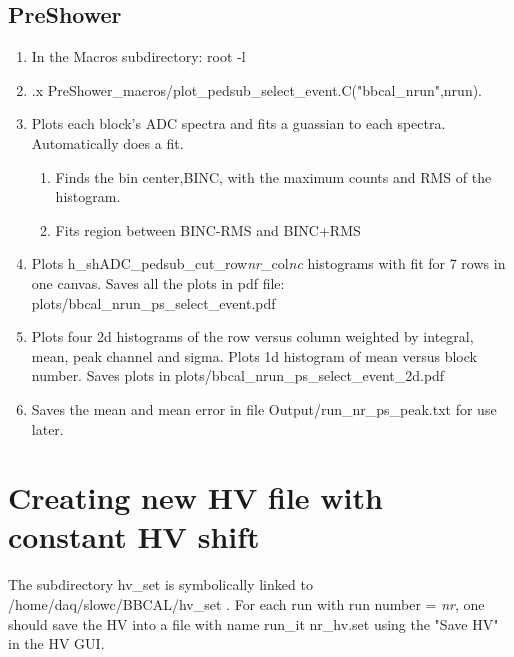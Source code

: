 \documentclass[]{article}
\begin{document}
\subsection{PreShower}
\begin{enumerate}
	\item In the Macros subdirectory: root -l
	\item .x PreShower\_macros/plot\_pedsub\_select\_event.C("bbcal\_nrun",nrun). 
	\item Plots each block's ADC spectra and fits a guassian to each spectra. Automatically does a fit.
	\begin{enumerate}
		\item Finds the bin center,BINC,  with the maximum counts and RMS of the histogram. 
		\item Fits region between BINC-RMS and BINC+RMS
	\end{enumerate}       
	\item Plots  h\_shADC\_pedsub\_cut\_row{\it nr}\_col{\it nc} histograms with fit for 7 rows in one canvas. Saves all the plots in pdf file: plots/bbcal\_nrun\_ps\_select\_event.pdf
	\item Plots four 2d histograms of the row versus column weighted by integral, mean, peak channel and sigma. Plots 1d histogram of mean versus block number. Saves plots in  plots/bbcal\_nrun\_ps\_select\_event\_2d.pdf
	\item Saves the mean and mean error in file Output/run\_nr\_ps\_peak.txt for use later.
\end{enumerate}
\section{Creating new HV file with constant HV shift}
The subdirectory hv\_set is symbolically linked to /home/daq/slowc/BBCAL/hv\_set . For each run with run number = {\it nr}, one should save the HV into a file with name run\_{it nr}\_hv.set using the "Save HV" in the HV GUI.
\end{document}
